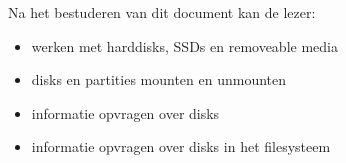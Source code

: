 Na het bestuderen van dit document kan de lezer:
\begin{itemize}
\item werken met harddisks, SSDs en removeable media
\item disks en partities mounten en unmounten
\item informatie opvragen over disks
\item informatie opvragen over disks in het filesysteem
\end{itemize}

